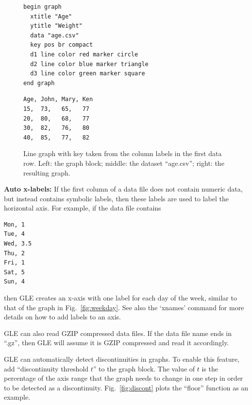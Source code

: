 \begin{commanddescription}
\begin{figure}[tb]
\begin{minipage}[t]{6.35cm}%
\begin{Verbatim}
begin graph
  xtitle "Age"
  ytitle "Weight"
  data "age.csv"
  key pos br compact
  d1 line color red marker circle
  d2 line color blue marker triangle
  d3 line color green marker square
end graph
\end{Verbatim}
\end{minipage}
\begin{minipage}[t]{3.5cm}%
\begin{Verbatim}
Age, John, Mary, Ken
15,  73,   65,   77
20,  80,   68,   77
30,  82,   76,   80
40,  85,   77,   82
\end{Verbatim}
\end{minipage}
\begin{minipage}[t]{6cm}%
\vskip0pt%
\mbox{}
\end{minipage}
\caption{\label{fig:autokey}Line graph with key taken from the column labels in the first data row. Left: the graph block; middle: the dataset ``age.csv''; right: the resulting graph.}
\end{figure}

{\bf Auto x-labels:} If the first column of a data file does not contain numeric data, but instead contains symbolic labels, then these labels are used to label the horizontal axis. For example, if the data file contains

\begin{Verbatim}
Mon, 1
Tue, 4
Wed, 3.5
Thu, 2
Fri, 1
Sat, 5
Sun, 4
\end{Verbatim}

\noindent{}then GLE creates an x-axis with one label for each day of the week, similar to that of the graph in Fig.~\ref{fig:weekday}. See also the `{\sf xnames}' command for more details on how to add labels to an axis.

GLE can also read GZIP compressed data files. If the data file name ends in ``.gz'', then GLE will assume it is GZIP compressed and read it accordingly.

\item[{\sf discontinuity threshold {\it t}}]

GLE can automatically detect discontinuities in graphs. To enable this feature, add ``{\sf discontinuity threshold $t$}'' to the graph block. The value of $t$ is the percentage of the axis range that the graph needs to change in one step in order to be detected as a discontinuity. Fig.~\ref{fig:discont} plots the ``floor'' function as an example.


\end{commanddescription}
